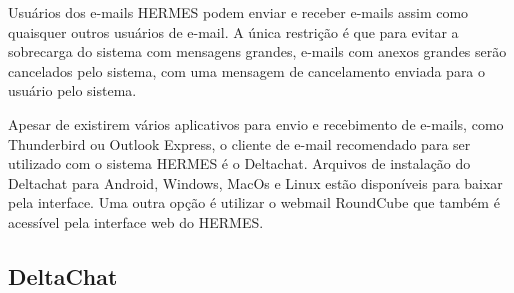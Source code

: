 \documentclass[11pt,a4paper]{article}
\begin{document}

Usuários dos e-mails HERMES podem enviar e receber e-mails assim como quaisquer outros usuários de e-mail. A única restrição é que para evitar a sobrecarga do sistema com mensagens grandes, e-mails com anexos grandes serão cancelados pelo sistema, com uma mensagem de cancelamento enviada para o usuário pelo sistema.



Apesar de existirem vários aplicativos para envio e recebimento de e-mails, como Thunderbird ou Outlook Express, o cliente de e-mail recomendado para ser utilizado com o sistema HERMES é o Deltachat. Arquivos de instalação do Deltachat para Android, Windows, MacOs e Linux estão disponíveis para baixar pela interface. Uma outra opção é utilizar o webmail RoundCube que também é acessível pela interface web do HERMES.


\subsection{DeltaChat}
\end{document}
